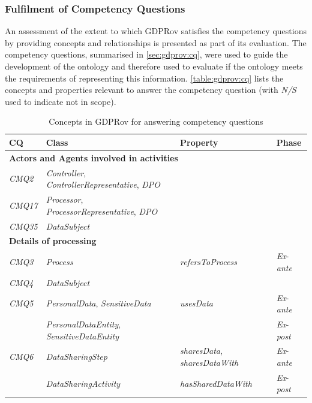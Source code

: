 \subsubsection{Fulfilment of Competency Questions}
An assessment of the extent to which GDPRov satisfies the competency questions by providing concepts and relationships is presented as part of its evaluation.
The competency questions, summarised in \autoref{sec:gdprov:cq}, were used to guide the development of the ontology and therefore used to evaluate if the ontology meets the requirements of representing this information.
\autoref{table:gdprov:cq} lists the concepts and properties relevant to answer the competency question (with \textit{N/S} used to indicate not in scope).
\begin{table}[htbp]
\footnotesize
\centering
{}
\begin{tabularx}{\linewidth}{|l|X|p{5cm}|l|}
\caption{Concepts in GDPRov for answering competency questions} \\ \hline
\label{table:gdprov:cq}
\textbf{CQ} & \textbf{Class} & \textbf{Property} & \textbf{Phase} \\ \hline
\multicolumn{4}{|l|}{\textbf{Actors and Agents involved in activities}}  \\ \hline
\textit{CMQ2} & \textit{Controller}, \textit{ControllerRepresentative}, \textit{DPO} &  &  \\ \hline
\textit{CMQ17} & \textit{Processor}, \textit{ProcessorRepresentative}, \textit{DPO} &  &  \\ \hline
\textit{CMQ35} & \textit{DataSubject} &  &  \\ \hline
\multicolumn{4}{|l|}{\textbf{Details of processing}}  \\ \hline
\textit{CMQ3} & \textit{Process} & \textit{refersToProcess} & \textit{Ex}-\textit{ante} \\ \hline
\textit{CMQ4} & \textit{DataSubject} &  &  \\ \hline
\textit{CMQ5} & \textit{PersonalData}, \textit{SensitiveData} & \textit{usesData} & \textit{Ex}-\textit{ante} \\ \hline
 & \textit{PersonalDataEntity}, \textit{SensitiveDataEntity} &  & \textit{Ex}-\textit{post} \\ \hline
\textit{CMQ6} & \textit{DataSharingStep} & \textit{sharesData}, \textit{sharesDataWith} & \textit{Ex}-\textit{ante} \\ \hline
 & \textit{DataSharingActivity} & \textit{hasSharedDataWith} & \textit{Ex}-\textit{post} \\ \hline

\end{tabularx}
\end{table}

